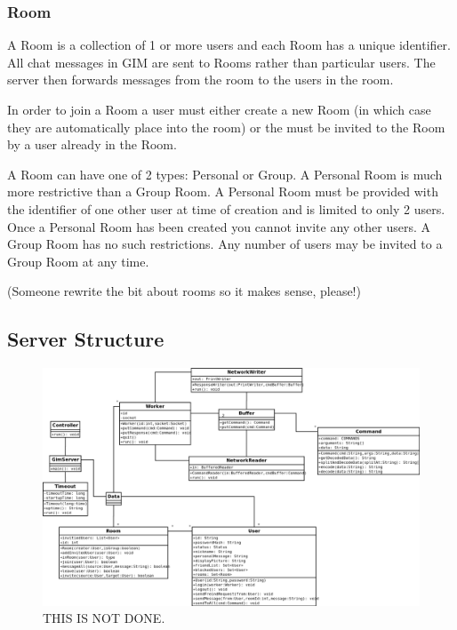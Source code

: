 \subsubsection{Room}
A Room is a collection of 1 or more users and each Room has a unique identifier. All chat messages in GIM are sent to Rooms rather than particular users. The server then forwards messages from the room to the users in the room.

In order to join a Room a user must either create a new Room (in which case they are automatically place into the room) or the must be invited to the Room by a user already in the Room. 

A Room can have one of 2 types: Personal or Group. A Personal Room is much more restrictive than a Group Room. A Personal Room must be provided with the identifier of one other user at time of creation and is limited to only 2 users. Once a Personal Room has been created you cannot invite any other users. A Group Room has no such restrictions. Any number of users may be invited to a Group Room at any time.

(Someone rewrite the bit about rooms so it makes sense, please!)

\subsection{Server Structure}

\begin{figure}[!h]
    \begin{center}
        \includegraphics[scale=0.65]{chapter2/diagrams/server_uml.png}
        \caption{THIS IS NOT DONE.}
        \label{highLevelDia}
    \end{center}
\end{figure}

